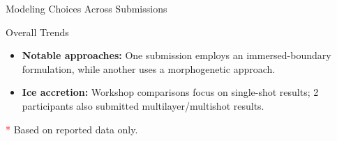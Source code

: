 \begin{frame}{\small Modeling Choices Across Submissions}
\begin{block}{\scriptsize Overall Trends}
\begin{itemize}
    \item \textbf{Notable approaches:}
    One submission employs an immersed-boundary formulation, while
    another uses a morphogenetic approach.

    \item \textbf{Ice accretion:}
    Workshop comparisons focus on single-shot results;
    2 participants also submitted multilayer/multishot results.

\end{itemize}
\end{block}

\vspace{-0.25cm}
\begin{flushleft}
{\tiny\textcolor{red}{*} Based on reported data only.}
\end{flushleft}

\end{frame}